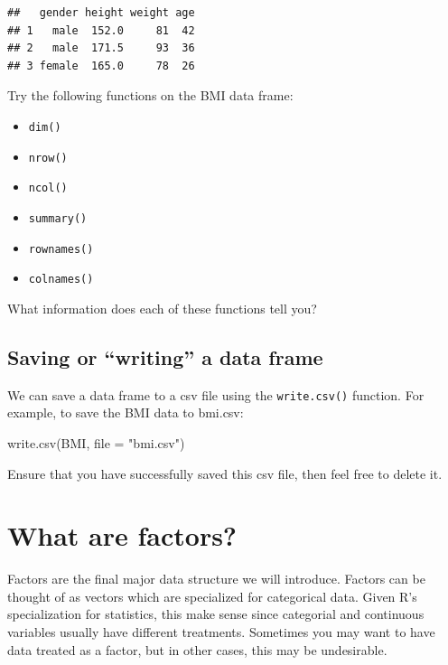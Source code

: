 \documentclass[
]{book}
\newenvironment{Shaded}{\begin{snugshade}}{\end{snugshade}}
\newcommand{\AttributeTok}[1]{\textcolor[rgb]{0.77,0.63,0.00}{#1}}
\newcommand{\FunctionTok}[1]{\textcolor[rgb]{0.00,0.00,0.00}{#1}}
\newcommand{\NormalTok}[1]{#1}
\newcommand{\StringTok}[1]{\textcolor[rgb]{0.31,0.60,0.02}{#1}}
\providecommand{\tightlist}{%
  \setlength{\itemsep}{0pt}\setlength{\parskip}{0pt}}
\begin{document}
\begin{verbatim}
##   gender height weight age
## 1   male  152.0     81  42
## 2   male  171.5     93  36
## 3 female  165.0     78  26
\end{verbatim}

Try the following functions on the BMI data frame:

\begin{itemize}
\tightlist
\item
  \texttt{dim()}
\item
  \texttt{nrow()}
\item
  \texttt{ncol()}
\item
  \texttt{summary()}
\item
  \texttt{rownames()}
\item
  \texttt{colnames()}
\end{itemize}

What information does each of these functions tell you?

\hypertarget{saving-or-writing-a-data-frame}{%
\subsection*{Saving or ``writing'' a data frame}\label{saving-or-writing-a-data-frame}}

We can save a data frame to a csv file using the \texttt{write.csv()} function. For example, to save the BMI data to bmi.csv:

\begin{Shaded}
\begin{Highlighting}[]
\FunctionTok{write.csv}\NormalTok{(BMI, }\AttributeTok{file =} \StringTok{"bmi.csv"}\NormalTok{)}
\end{Highlighting}
\end{Shaded}

Ensure that you have successfully saved this csv file, then feel free to delete it.

\hypertarget{what-are-factors}{%
\section{What are factors?}\label{what-are-factors}}

Factors are the final major data structure we will introduce. Factors can be thought of as vectors which are specialized for categorical data. Given R's specialization for statistics, this make sense since categorial and continuous variables usually have different treatments. Sometimes you may want to have data treated as a factor, but in other cases, this may be undesirable.
\end{document}
